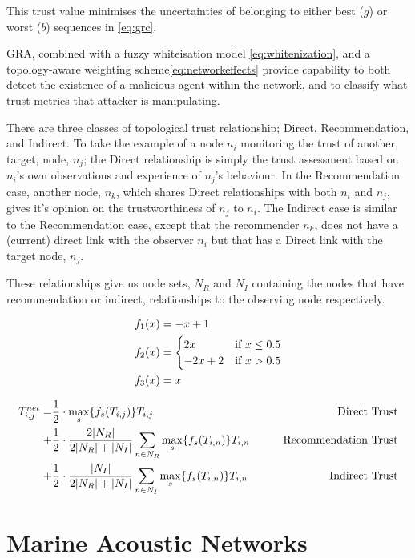 \documentclass[runningheads,a4paper]{llncs}
\begin{document}
This trust value minimises the uncertainties of belonging to either best ($g$) or worst ($b$) sequences in \eqref{eq:grc}.

GRA, combined with a fuzzy whiteisation model \eqref{eq:whitenization}, and a topology-aware weighting scheme\eqref{eq:networkeffects} provide capability to both detect the existence of a malicious agent within the network, and to classify what trust metrics that attacker is manipulating.

There are three classes of topological trust relationship; Direct, Recommendation, and Indirect.
To take the example of a node $n_i$ monitoring the trust of another, target, node, $n_j$; the Direct relationship is simply the trust assessment based on $n_i$'s own observations and experience of $n_j$'s behaviour.
In the Recommendation case, another node, $n_k$, which shares Direct relationships with both $n_i$ and $n_j$, gives it's opinion on the trustworthiness of $n_j$ to $n_i$.
The Indirect case is similar to the Recommendation case, except that the recommender $n_k$, does not have a (current) direct link with the observer $n_i$ but that has a Direct link with the target node, $n_j$.

These relationships give us node sets, $N_R$ and $N_I$ containing the nodes that have recommendation or indirect, relationships to the observing node respectively.

\begin{align}
  \label{eq:whitenization}
  f_1(x) &= -x+1\notag\\
  f_2(x) &= 
  \begin{cases}
    2x & \text{if }x\leq 0.5\\
    -2x+2 & \text{if }x>0.5
  \end{cases}\\
  f_3(x) &= x\notag
\end{align}

\begin{align}
  \label{eq:networkeffects}
  T_{i,j}^{net}=&\frac{1}{2} \cdot \max_s\{f_s(T_{i,j})\} T_{i,j}&\qquad \text{Direct Trust}\notag \\
  +&\frac{1}{2} \cdot \frac{2|N_R| }{2|N_R| + |N_I|}\sum_{n \in N_R} \max_s\{f_s(T_{i,n})\} T_{i,n}&\qquad \text{Recommendation Trust}\notag\\
  +&\frac{1}{2} \cdot \frac{|N_I| }{2|N_R| + |N_I|}\sum_{n \in N_I} \max_s\{f_s(T_{i,n})\} T_{i,n} &\qquad \text{Indirect Trust}
\end{align}


\section{Marine Acoustic Networks}\label{sec:marineacousticnetworks}
\end{document}
